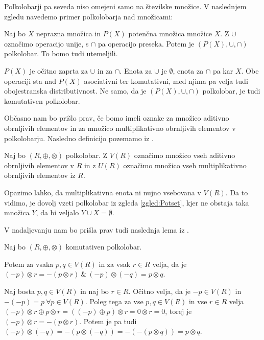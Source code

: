 \documentclass[mat1]{fmfdelo}
\begin{document}
Polkolobarji pa seveda niso omejeni samo na številske množice. V naslednjem zgledu navedemo primer polkolobarja nad množicami:
\begin{zgled} \label{zgled:Potset}
	Naj bo $X$ neprazna množica in $P(X)$ potenčna množica množice $X$. Z $\cup$ označimo operacijo unije, s $\cap$ pa operacijo preseka. Potem je $(P(X), \cup, \cap)$ polkolobar. To bomo tudi utemeljili.
	
	$P(X)$ je očitno zaprta za $\cup$ in za $\cap$. Enota za $\cup$ je $\emptyset$, enota za $\cap$ pa kar $X$. Obe operaciji sta nad $P(X)$ asociativni ter komutativni, med njima pa velja tudi obojestranska distributivnost. Ne samo, da je $(P(X), \cup, \cap)$ polkolobar, je tudi komutativen polkolobar.
\end{zgled}

Občasno nam bo prišlo prav, če bomo imeli oznake za množico aditivno obrnljivih elementov in za množico multiplikativno obrnljivih elementov v polkolobarju. Nasledno definicijo pozemamo iz \cite[str. $3$]{bib:Tanbase}.

\begin{definicija}
	Naj bo $(R, \oplus, \otimes)$ polkolobar. Z $V(R)$ označimo množico vseh aditivno obrnljivih elementov v $R$ in z $U(R)$ označimo množico vseh multiplikativno obrnljivih elementov iz $R$.
\end{definicija}

Opazimo lahko, da multiplikativna enota ni nujno vsebovana v $V(R)$. Da to vidimo, je dovolj vzeti polkolobar iz zgleda \ref{zgled:Potset}, kjer ne obstaja taka množica $Y$, da bi veljalo $Y \cup X = \emptyset$.

V nadaljevanju nam bo prišla prav tudi naslednja lema iz \cite[lema 2\,1]{bib:Tanbase}.

\begin{lema} \label{lema:invvpolkolob}
	Naj bo $(R, \oplus, \otimes)$ komutativen polkolobar. 
	
	Potem za vsaka $p, q\in V(R)$ in za vsak $r\in R$ velja, da je $(-p)\otimes r = - (p\otimes r)~\&~ (-p)\otimes(-q) = p\otimes q$.
\end{lema}

\begin{dokaz}
	Naj bosta $p, q \in V(R)$ in naj bo $r\in R$. Očitno velja, da je $-p\in V(R)$ in $-(-p) = p~\forall p\in V(R)$. Poleg tega za vse $p, q\in V(R)$ in vse $r\in R$ velja $(-p)\otimes r \oplus p \otimes r = ((-p) \oplus p)\otimes r = 0\otimes r = 0$, torej je $(-p)\otimes r = -(p\otimes r)$. Potem je pa tudi $(-p)\otimes(-q) = -(p\otimes(-q)) = -(-(p\otimes q)) = p\otimes q$.
\end{dokaz}
\end{document}
